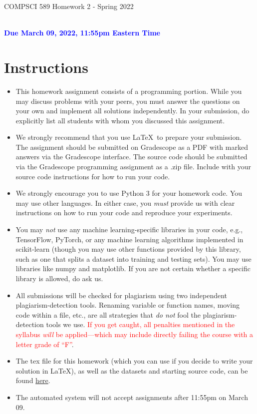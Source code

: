 \documentclass[letterpaper]{article}
\newcommand{\HIGHLIGHT}[1]{\textcolor{blue}{\textbf{#1}}}
\begin{document}
\newpage
\begin{center}
    \begin{Large}
    COMPSCI 589 Homework 2 - Spring 2022
    \end{Large}
    \\
    \HIGHLIGHT{Due March 09, 2022, 11:55pm Eastern Time}
\end{center}



\vspace{0.25in}
\section{Instructions}

\begin{itemize}
    \item This homework assignment consists of a programming portion. While you may discuss problems with your peers, you must answer the questions on your own and implement all solutions independently. In your submission, do explicitly list all students with whom you discussed this assignment. 
    \item We strongly recommend that you use \LaTeX~to prepare your submission. The assignment should be submitted on Gradescope as a PDF with marked answers via the Gradescope interface. The source code should be submitted via the Gradescope programming assignment as a .zip file. Include with your source code instructions for how to run your code. 
    \item We strongly encourage you to use Python 3 for your homework code. You may use other languages. In either case, you \textit{must} provide us with clear instructions on how to run your code and reproduce your experiments. 
    \item You may \textit{not} use any machine learning-specific libraries in your code, e.g., TensorFlow, PyTorch, or any machine learning algorithms implemented in scikit-learn (though you may use other functions provided by this library, such as one that splits a dataset into training and testing sets). You may use libraries like numpy and matplotlib. If you are not certain whether a specific library is allowed, do ask us.
    \item All submissions will be checked for plagiarism using two independent plagiarism-detection tools. Renaming variable or function names, moving code within a file, etc., are all strategies that \textit{do not} fool the plagiarism-detection tools we use. \textcolor{red}{If you get caught, all penalties mentioned in the syllabus \textit{will} be applied---which may include directly failing the course with a letter grade of ``F''}.
    \item The tex file for this homework (which you can use if you decide to write your solution in \LaTeX), as well as the datasets and starting source code, can be found \href{https://people.cs.umass.edu/~bsilva/courses/CMPSCI_589/Spring2022/homeworks/hw2.zip}{here}.
    \item The automated system will not accept assignments after 11:55pm on March 09. 
\end{itemize}
\end{document}
